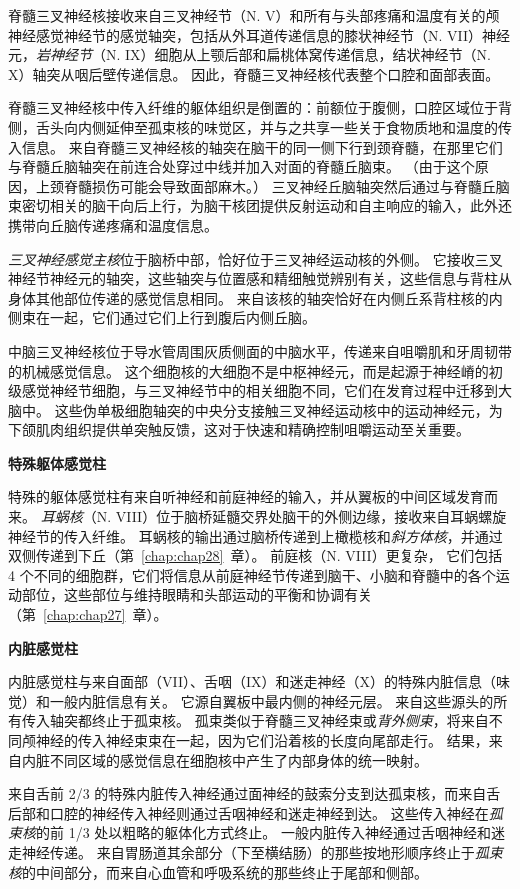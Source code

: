 脊髓三叉神经核接收来自三叉神经节（N. V）和所有与头部疼痛和温度有关的颅神经感觉神经节的感觉轴突，包括从外耳道传递信息的膝状神经节（N. VII）神经元，\textit{岩神经节}（N. IX）细胞从上颚后部和扁桃体窝传递信息，结状神经节（N. X）轴突从咽后壁传递信息。
因此，脊髓三叉神经核代表整个口腔和面部表面。


脊髓三叉神经核中传入纤维的躯体组织是倒置的：前额位于腹侧，口腔区域位于背侧，舌头向内侧延伸至孤束核的味觉区，并与之共享一些关于食物质地和温度的传入信息。
来自脊髓三叉神经核的轴突在脑干的同一侧下行到颈脊髓，在那里它们与脊髓丘脑轴突在前连合处穿过中线并加入对面的脊髓丘脑束。
（由于这个原因，上颈脊髓损伤可能会导致面部麻木。）
三叉神经丘脑轴突然后通过与脊髓丘脑束密切相关的脑干向后上行，为脑干核团提供反射运动和自主响应的输入，此外还携带向丘脑传递疼痛和温度信息。


\textit{三叉神经感觉主核}位于脑桥中部，恰好位于三叉神经运动核的外侧。
它接收三叉神经节神经元的轴突，这些轴突与位置感和精细触觉辨别有关，这些信息与背柱从身体其他部位传递的感觉信息相同。
来自该核的轴突恰好在内侧丘系背柱核的内侧束在一起，它们通过它们上行到腹后内侧丘脑。


中脑三叉神经核位于导水管周围灰质侧面的中脑水平，传递来自咀嚼肌和牙周韧带的机械感觉信息。
这个细胞核的大细胞不是中枢神经元，而是起源于神经嵴的初级感觉神经节细胞，与三叉神经节中的相关细胞不同，它们在发育过程中迁移到大脑中。
这些伪单极细胞轴突的中央分支接触三叉神经运动核中的运动神经元，为下颌肌肉组织提供单突触反馈，这对于快速和精确控制咀嚼运动至关重要。


\textbf{特殊躯体感觉柱}

特殊的躯体感觉柱有来自听神经和前庭神经的输入，并从翼板的中间区域发育而来。
\textit{耳蜗核}（N. VIII）位于脑桥延髓交界处脑干的外侧边缘，接收来自耳蜗螺旋神经节的传入纤维。
耳蜗核的输出通过脑桥传递到上橄榄核和\textit{斜方体核}，并通过双侧传递到下丘（第~\ref{chap:chap28}~章）。
前庭核（N. VIII）更复杂，
它们包括 4 个不同的细胞群，它们将信息从前庭神经节传递到脑干、小脑和脊髓中的各个运动部位，这些部位与维持眼睛和头部运动的平衡和协调有关（第~\ref{chap:chap27}~章）。


\textbf{内脏感觉柱}

内脏感觉柱与来自面部（VII）、舌咽（IX）和迷走神经（X）的特殊内脏信息（味觉）和一般内脏信息有关。
它源自翼板中最内侧的神经元层。
来自这些源头的所有传入轴突都终止于孤束核。
孤束类似于脊髓三叉神经束或\textit{背外侧束}，将来自不同颅神经的传入神经束束在一起，因为它们沿着核的长度向尾部走行。
结果，来自内脏不同区域的感觉信息在细胞核中产生了内部身体的统一映射。


来自舌前 2/3 的特殊内脏传入神经通过面神经的鼓索分支到达孤束核，而来自舌后部和口腔的神经传入神经则通过舌咽神经和迷走神经到达。
这些传入神经在\textit{孤束核}的前 1/3 处以粗略的躯体化方式终止。
一般内脏传入神经通过舌咽神经和迷走神经传递。
来自胃肠道其余部分（下至横结肠）的那些按地形顺序终止于\textit{孤束核}的中间部分，而来自心血管和呼吸系统的那些终止于尾部和侧部。


